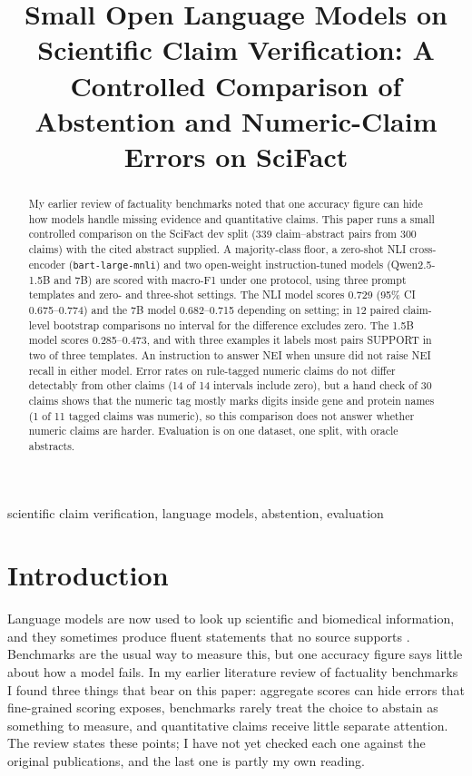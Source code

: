 \documentclass[conference]{IEEEtran}
\begin{document}
\title{Small Open Language Models on Scientific Claim Verification: A Controlled Comparison of Abstention and Numeric-Claim Errors on SciFact}

\author{
}

\maketitle

\begin{abstract}
My earlier review of factuality benchmarks noted that one accuracy figure can hide how models handle missing evidence and quantitative claims. This paper runs a small controlled comparison on the SciFact dev split (339 claim--abstract pairs from 300 claims) with the cited abstract supplied. A majority-class floor, a zero-shot NLI cross-encoder (\texttt{bart-large-mnli}) and two open-weight instruction-tuned models (Qwen2.5-1.5B and 7B) are scored with macro-F1 under one protocol, using three prompt templates and zero- and three-shot settings. The NLI model scores 0.729 (95\% CI 0.675--0.774) and the 7B model 0.682--0.715 depending on setting; in 12 paired claim-level bootstrap comparisons no interval for the difference excludes zero. The 1.5B model scores 0.285--0.473, and with three examples it labels most pairs SUPPORT in two of three templates. An instruction to answer NEI when unsure did not raise NEI recall in either model. Error rates on rule-tagged numeric claims do not differ detectably from other claims (14 of 14 intervals include zero), but a hand check of 30 claims shows that the numeric tag mostly marks digits inside gene and protein names (1 of 11 tagged claims was numeric), so this comparison does not answer whether numeric claims are harder. Evaluation is on one dataset, one split, with oracle abstracts.
\end{abstract}

\begin{IEEEkeywords}
scientific claim verification, language models, abstention, evaluation
\end{IEEEkeywords}

\section{Introduction}
Language models are now used to look up scientific and biomedical information, and they sometimes produce fluent statements that no source supports \cite{ji2023}. Benchmarks are the usual way to measure this, but one accuracy figure says little about how a model fails. In my earlier literature review of factuality benchmarks I found three things that bear on this paper: aggregate scores can hide errors that fine-grained scoring exposes, benchmarks rarely treat the choice to abstain as something to measure, and quantitative claims receive little separate attention. The review states these points; I have not yet checked each one against the original publications, and the last one is partly my own reading.
\end{document}
